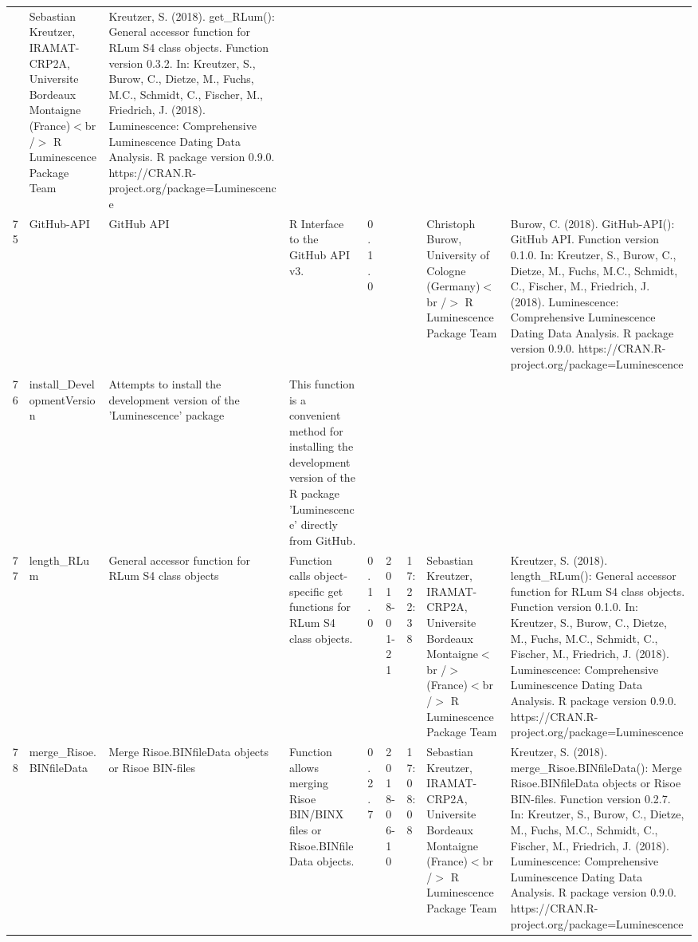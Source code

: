 \begin{table}[ht]
\begin{tabular}{rllllllll}
 & Sebastian Kreutzer, IRAMAT-CRP2A, Universite Bordeaux Montaigne (France)$<$br /$>$  R Luminescence Package Team & Kreutzer, S. (2018). get\_RLum(): General accessor function for RLum S4 class objects. Function version 0.3.2. In: Kreutzer, S., Burow, C., Dietze, M., Fuchs, M.C., Schmidt, C., Fischer, M., Friedrich, J. (2018). Luminescence: Comprehensive Luminescence Dating Data Analysis. R package version 0.9.0. https://CRAN.R-project.org/package=Luminescence
 \\ 
  75 & GitHub-API & GitHub API & R Interface to the GitHub API v3. & 0.1.0
 &  &  & Christoph Burow, University of Cologne (Germany)$<$br /$>$  R Luminescence Package Team & Burow, C. (2018). GitHub-API(): GitHub API. Function version 0.1.0. In: Kreutzer, S., Burow, C., Dietze, M., Fuchs, M.C., Schmidt, C., Fischer, M., Friedrich, J. (2018). Luminescence: Comprehensive Luminescence Dating Data Analysis. R package version 0.9.0. https://CRAN.R-project.org/package=Luminescence
 \\ 
  76 & install\_DevelopmentVersion & Attempts to install the development version of the 'Luminescence' package & This function is a convenient method for installing the development version of the R package 'Luminescence' directly from GitHub. &  &  &  &  &  \\ 
  77 & length\_RLum & General accessor function for RLum S4 class objects & Function calls object-specific get functions for RLum S4 class objects. & 0.1.0 & 2018-01-21 & 17:22:38
 & Sebastian Kreutzer, IRAMAT-CRP2A, Universite Bordeaux Montaigne$<$br /$>$ (France)$<$br /$>$  R Luminescence Package Team & Kreutzer, S. (2018). length\_RLum(): General accessor function for RLum S4 class objects. Function version 0.1.0. In: Kreutzer, S., Burow, C., Dietze, M., Fuchs, M.C., Schmidt, C., Fischer, M., Friedrich, J. (2018). Luminescence: Comprehensive Luminescence Dating Data Analysis. R package version 0.9.0. https://CRAN.R-project.org/package=Luminescence
 \\ 
  78 & merge\_Risoe.BINfileData & Merge Risoe.BINfileData objects or Risoe BIN-files & Function allows merging Risoe BIN/BINX files or Risoe.BINfileData objects. & 0.2.7 & 2018-06-10 & 17:08:08
 & Sebastian Kreutzer, IRAMAT-CRP2A, Universite Bordeaux Montaigne (France)$<$br /$>$  R Luminescence Package Team & Kreutzer, S. (2018). merge\_Risoe.BINfileData(): Merge Risoe.BINfileData objects or Risoe BIN-files. Function version 0.2.7. In: Kreutzer, S., Burow, C., Dietze, M., Fuchs, M.C., Schmidt, C., Fischer, M., Friedrich, J. (2018). Luminescence: Comprehensive Luminescence Dating Data Analysis. R package version 0.9.0. https://CRAN.R-project.org/package=Luminescence

\end{tabular}
\end{table}
